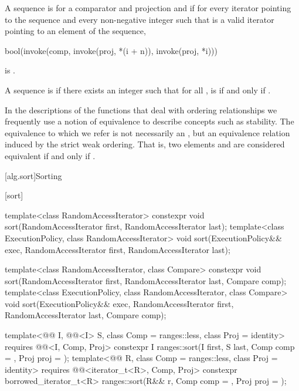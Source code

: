 \pnum
A sequence is 
for a comparator and projection  and 
if for every iterator  pointing to the sequence and
every non-negative integer 
such that  is a valid iterator
pointing to an element of the sequence,
\begin{codeblock}
bool(invoke(comp, invoke(proj, *(i + n)), invoke(proj, *i)))
\end{codeblock}
is .

\pnum
A sequence  is
 
if there exists an integer 
such that for all ,
 is  if and only if .

\pnum
In the descriptions of the functions that deal with ordering relationships
we frequently use a notion of equivalence to describe concepts
such as stability.
The equivalence to which we refer is not necessarily an ,
but an equivalence relation induced by the strict weak ordering.
That is, two elements  and  are considered equivalent
if and only if .

[alg.sort]{Sorting}

[sort]{}

%
\begin{itemdecl}
template<class RandomAccessIterator>
  constexpr void sort(RandomAccessIterator first, RandomAccessIterator last);
template<class ExecutionPolicy, class RandomAccessIterator>
  void sort(ExecutionPolicy&& exec,
            RandomAccessIterator first, RandomAccessIterator last);

template<class RandomAccessIterator, class Compare>
  constexpr void sort(RandomAccessIterator first, RandomAccessIterator last,
                      Compare comp);
template<class ExecutionPolicy, class RandomAccessIterator, class Compare>
  void sort(ExecutionPolicy&& exec,
            RandomAccessIterator first, RandomAccessIterator last,
            Compare comp);

template<@@ I, @@<I> S, class Comp = ranges::less,
         class Proj = identity>
  requires @@<I, Comp, Proj>
  constexpr I
    ranges::sort(I first, S last, Comp comp = {}, Proj proj = {});
template<@@ R, class Comp = ranges::less, class Proj = identity>
  requires @@<iterator_t<R>, Comp, Proj>
  constexpr borrowed_iterator_t<R>
    ranges::sort(R&& r, Comp comp = {}, Proj proj = {});
\end{itemdecl}

